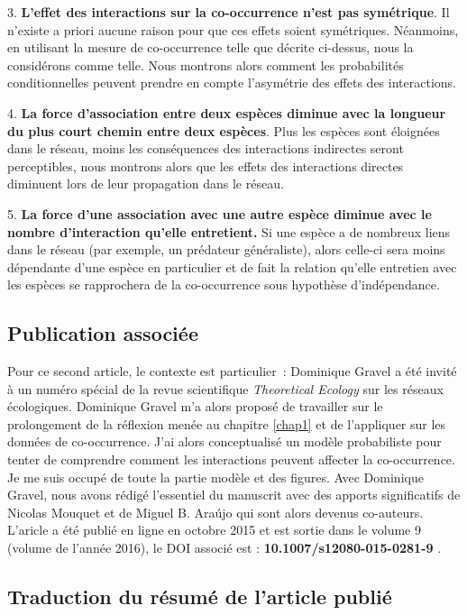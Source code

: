 3. \textbf{L'effet des interactions sur la co-occurrence n'est pas symétrique}. Il n'existe a priori aucune raison pour que ces effets soient symétriques. Néanmoins, en utilisant la mesure de co-occurrence telle que décrite ci-dessus, nous la considérons comme telle. Nous montrons alors comment les probabilités conditionnelles peuvent prendre en compte l'asymétrie des effets des interactions.

4. \textbf{La force d'association entre deux espèces diminue avec la longueur du plus court chemin entre deux espèces}. Plus les espèces sont éloignées dans le réseau, moins les conséquences des interactions indirectes seront perceptibles, nous montrons alors que les effets des interactions directes diminuent lors de leur propagation dans le réseau.

5. \textbf{La force d'une association avec une autre espèce diminue avec le nombre d'interaction qu'elle entretient.} Si une espèce a de nombreux liens dans le réseau (par exemple, un prédateur généraliste), alors celle-ci sera moins dépendante d'une espèce en particulier et de fait la relation qu'elle entretien avec les espèces se rapprochera de la co-occurrence sous hypothèse d'indépendance.

\subsection{Publication associée}

Pour ce second article, le contexte est particulier~: Dominique Gravel a été invité à un numéro spécial de la revue scientifique \textit{Theoretical Ecology} sur les réseaux écologiques. Dominique Gravel m'a alors proposé de travailler sur le prolongement de la réflexion menée au chapitre \ref{chap1} et de l'appliquer sur les données de co-occurrence. J'ai alors conceptualisé un modèle probabiliste pour tenter de comprendre comment les interactions peuvent affecter la co-occurrence. Je me suis occupé de toute la partie modèle et des figures. Avec Dominique Gravel, nous avons rédigé l'essentiel du manuscrit avec des apports significatifs de Nicolas Mouquet et de  Miguel B. Ara\'ujo qui sont alors devenus co-auteurs.
L'aricle a été publié en ligne en octobre 2015 et est sortie dans le volume 9
(volume de l'année 2016), le DOI associé est :
\textbf{10.1007/s12080-015-0281-9} \citep{Cazelles2016}.

\subsection{Traduction du résumé de l'article publié}

